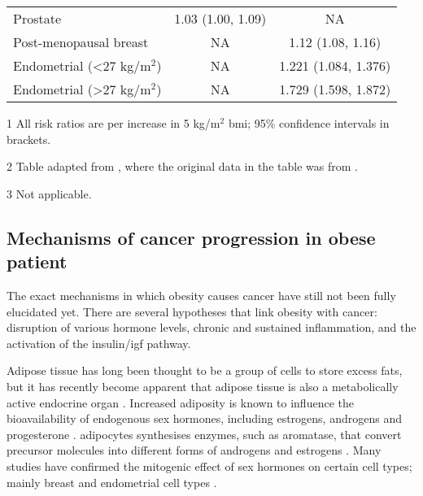 \begin{table}[htb]
\begin{threeparttable}
\begin{tabular}{lcc}
			Prostate                                & 1.03 (1.00, 1.09) & NA\\
			Post-menopausal breast                  & NA                & 1.12 (1.08, 1.16)\\
			Endometrial (\textless{}27 kg/m$^2$)    & NA                & 1.221 (1.084, 1.376)\\
			Endometrial (\textgreater{}27 kg/m$^2$) & NA                & 1.729 (1.598, 1.872)\\
			\hline
			\hline
		\end{tabular}
		\begin{tablenotes}
			\begin{footnotesize}
				\item [1] All risk ratios are per increase in 5 kg/m$^2$ \gls{bmi}; 95\% confidence intervals in brackets.
				\item [2] Table adapted from \citet{Roberts2010}, where the original data in the table was from \citet{Renehan2008}.
				\item [3] Not applicable.
			\end{footnotesize}
		\end{tablenotes}
	\end{threeparttable}
\end{table}

\subsection{Mechanisms of cancer progression in obese patient}
\label{sub:mechanisms_of_cancer_progression_in_obese_patient}

The exact mechanisms in which obesity causes cancer have still not been fully elucidated yet.
There are several hypotheses that link obesity with cancer: disruption of various hormone levels, chronic and sustained inflammation, and the activation of the insulin/\gls{igf} pathway.

Adipose tissue has long been thought to be a group of cells to store excess fats, but it has recently become apparent that adipose tissue is also a metabolically active endocrine organ \citep{Roberts2010}.
Increased adiposity is known to influence the bioavailability of endogenous sex hormones, including estrogens, androgens and progesterone \citep{Calle2004}.
\Glspl{adipocyte} synthesises enzymes, such as aromatase, that convert precursor molecules into different forms of androgens and estrogens \citep{Calle2004}.
Many studies have confirmed the mitogenic effect of sex hormones on certain cell types; mainly breast and endometrial cell types \citep{Roberts2010}.

